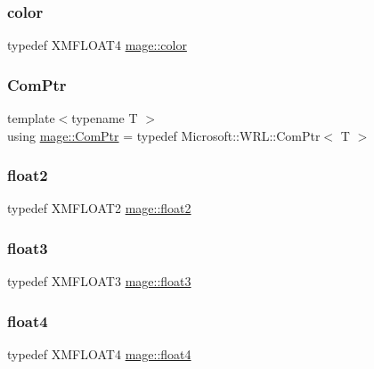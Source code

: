 \subsubsection{\texorpdfstring{color}{color}}
{\footnotesize\ttfamily typedef X\+M\+F\+L\+O\+A\+T4 \hyperlink{namespacemage_a56eceea5a9bceb2b56073f3ea4945781}{mage\+::color}}

\hypertarget{namespacemage_ae74f374780900893caa5555d1031fd79}{}\label{namespacemage_ae74f374780900893caa5555d1031fd79} 
\subsubsection{\texorpdfstring{Com\+Ptr}{ComPtr}}
{\footnotesize\ttfamily template$<$typename T $>$ \\
using \hyperlink{namespacemage_ae74f374780900893caa5555d1031fd79}{mage\+::\+Com\+Ptr} = typedef Microsoft\+::\+W\+R\+L\+::\+Com\+Ptr$<$ T $>$}

\hypertarget{namespacemage_a536f5856288c280080c9cdf739e85ddc}{}\label{namespacemage_a536f5856288c280080c9cdf739e85ddc} 
\subsubsection{\texorpdfstring{float2}{float2}}
{\footnotesize\ttfamily typedef X\+M\+F\+L\+O\+A\+T2 \hyperlink{namespacemage_a536f5856288c280080c9cdf739e85ddc}{mage\+::float2}}

\hypertarget{namespacemage_aab5dae4b0aaf8129b9e0d651d91d4b38}{}\label{namespacemage_aab5dae4b0aaf8129b9e0d651d91d4b38} 
\subsubsection{\texorpdfstring{float3}{float3}}
{\footnotesize\ttfamily typedef X\+M\+F\+L\+O\+A\+T3 \hyperlink{namespacemage_aab5dae4b0aaf8129b9e0d651d91d4b38}{mage\+::float3}}

\hypertarget{namespacemage_aa79484ea5211c29727b3794199ac0a55}{}\label{namespacemage_aa79484ea5211c29727b3794199ac0a55} 
\subsubsection{\texorpdfstring{float4}{float4}}
{\footnotesize\ttfamily typedef X\+M\+F\+L\+O\+A\+T4 \hyperlink{namespacemage_aa79484ea5211c29727b3794199ac0a55}{mage\+::float4}}


